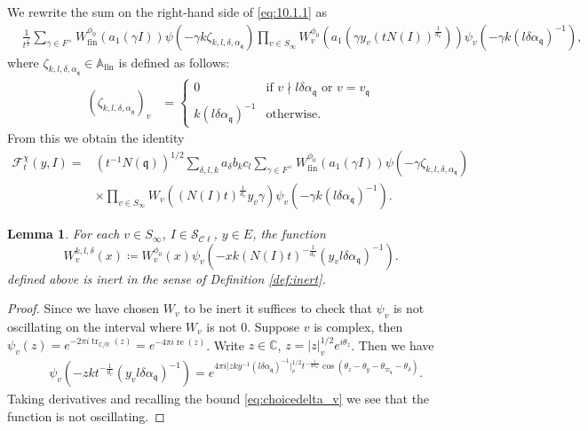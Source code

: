 \documentclass[a4paper,11pt]{amsart}
\newtheorem{lemma}[theorem]{Lemma}
\theoremstyle{definition}
\newcommand{\A}{\mathbb{A}}
\newcommand{\R}{\mathbb{R}}
\newcommand{\cl}{\mathcal{C}\ell}
\newcommand{\real}{\operatorname{re}}
\newcommand{\fin}{\text{fin}}
\newcommand{\CC}{\mathbb{C}}
\begin{document}
We rewrite the sum on the right-hand side of \eqref{eq:10.1.1} as 
\begin{align*}
    &\frac{1}{t^{\frac{1}{2}}}\sum_{\gamma \in F^{\times}}W_{\fin}^{\phi_0}(a_1(\gamma I))\psi(-\gamma k \zeta_{k,l,\delta,\alpha_{\mathfrak{q}}})\prod_{v \in S_{\infty}} W^{\phi_0}_v(a_1(\gamma y_v (tN(I))^{\frac{1}{d_v}}) )\psi_v\left(-\gamma k(l\delta\alpha_{\mathfrak{q}})^{-1}\right),
\end{align*}
where $\zeta_{k,l,\delta,\alpha_{\mathfrak{q}}} \in \A_{\fin}$ is defined as follows:
\begin{align*}
    (\zeta_{k,l,\delta,\alpha_{\mathfrak{q}}})_v &= \begin{cases}
        0 & \text{if }v\nmid l\delta\alpha_{\mathfrak{q}} \text{ or } v= v_{\mathfrak{q}}\\
        k(l\delta \alpha_{\mathfrak{q}})^{-1}&\text{otherwise.}
    \end{cases}
\end{align*}
From this we obtain the identity
\begin{align*}\label{eq:fty} 
\mathcal{F}_t^{\chi}({y,I})=& (t^{-1}N(\mathfrak{q}))^{1/2}\sum_{\delta,l,k}a_{\delta}b_kc_l \sum_{\gamma \in F^{\times}}W^{\phi_0}_{\fin}(a_1(\gamma I))\psi(-\gamma \zeta_{k,l,\delta,\alpha_\mathfrak{q}})\\&\times \prod_{v\in S_{\infty}} W_v((N(I)t)^{\frac{1}{d_v}}y_v\gamma) \psi_v\left(-\gamma k(l\delta\alpha_{\mathfrak{q}})^{-1}\right).
\end{align*}


\begin{lemma} For each $v\in S_{\infty}$, $I \in \mathcal{S}_{\cl}$, $y\in E$, the function \begin{equation*}
    W_v^{k,l,\delta}(x) \coloneqq W^{\phi_0}_v(x)\psi_v(-xk(N(I)t)^{-\frac{1}{d_v}}(y_vl\delta\alpha_{\mathfrak{q}})^{-1}). 
\end{equation*} defined above is \emph{inert} in the sense of Definition \ref{def:inert}. 
\end{lemma}
\begin{proof}
    Since we have chosen $W_v$ to be inert it suffices to check that $\psi_v$ is not oscillating on the interval where $W_v$ is not $0$. Suppose $v$ is complex, then $\psi_v(z) = e^{-2\pi i\operatorname{tr}_{\CC/\R}(z)} = e^{-4\pi i\real(z)}$. Write $z \in \CC$, $z = \vert z\vert_v^{1/2}e^{i\theta_z}$. Then we have 
    \begin{align*}
        &\psi_v(-zkt^{-\frac{1}{d_v}}(y_vl\delta\alpha_{\mathfrak{q}})^{-1}) = e^{4\pi i \vert zk{y}^{-1}{(l\delta\alpha_\mathfrak{q})}^{-1}\vert_v^{1/2} t^{-\frac{1}{2d_\infty}}\cos(\theta_{z}-\theta_y-\theta_{\varpi_\mathfrak{q}}-\theta_{\delta})}.
    \end{align*}
    Taking derivatives and recalling the bound \eqref{eq:choicedelta_v} we see that the function is not oscillating.
\end{proof}
\end{document}
